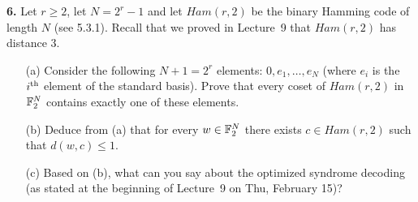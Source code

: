 \documentclass[12pt]{amsart}
\begin{document}
{\bf 6.} Let $r\geq 2$, let $N=2^r-1$ and let $Ham(r,2)$ be the binary Hamming code of length $N$ (see 5.3.1). Recall that we proved in Lecture~9 that $Ham(r,2)$ has distance 3. 
\begin{itemize}
\item[(a)] Consider the following $N+1=2^r$ elements: $0,e_1,\ldots, e_{N}$ (where $e_i$ is the $i^{\rm th}$ element of the standard basis). Prove that every coset of $Ham(r,2)$ in ${\mathbb F}_2^N$ contains exactly one of these elements.
\item[(b)] Deduce from (a) that for every $w\in {\mathbb F}_2^N$ there exists $c\in Ham(r,2)$ such that $d(w,c)\leq 1$. 
\item[(c)] Based on (b), what can you say about the optimized syndrome decoding (as stated at the beginning of Lecture~9
on Thu, February 15)?
\end{itemize}
\skv
\end{document}
